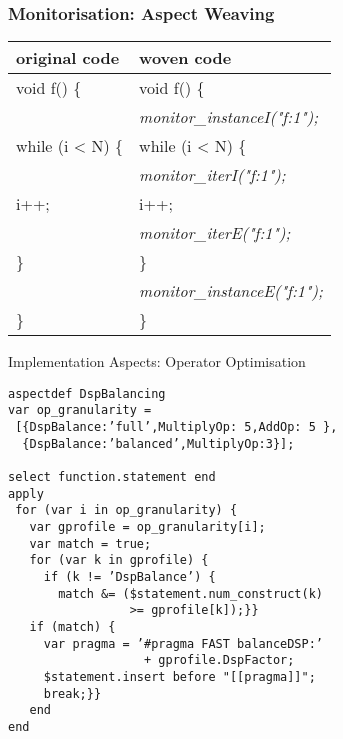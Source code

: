 \begin{frame}
  \frametitle{Monitorisation: Aspect Weaving}
\begin{center}
\begin{tabular}{p{5cm}|p{5cm}}
\hline
\bf{original code}           & \bf{woven code}                                   \\
\hline
\hline
void f() \{                  & void f() \{                                       \\
                             & \hspace{3ex}\emph{monitor\_instanceI("f:1");} \\
\hspace{3ex}while (i < N) \{ & \hspace{3ex}while (i < N) \{                      \\
                             & \hspace{6ex}\emph{monitor\_iterI("f:1");}     \\
\hspace{6ex}i++;             & \hspace{6ex}i++;                                  \\
                             & \hspace{6ex}\emph{monitor\_iterE("f:1");}     \\
\hspace{3ex}\}               & \hspace{3ex}\}                                    \\
                             & \hspace{3ex}\emph{monitor\_instanceE("f:1");} \\
\}                           & \}                                                \\
\hline
\end{tabular}
\end{center}
\end{frame}


\begin{frame}[fragile]{Implementation Aspects: Operator Optimisation}
\begin{lstlisting}[label=lst:label, style=lara]
aspectdef DspBalancing
var op_granularity =
 [{DspBalance:’full’,MultiplyOp: 5,AddOp: 5 },
  {DspBalance:’balanced’,MultiplyOp:3}];

select function.statement end
apply
 for (var i in op_granularity) {
   var gprofile = op_granularity[i];
   var match = true;
   for (var k in gprofile) {
     if (k != ’DspBalance’) {
       match &= ($statement.num_construct(k)
                 >= gprofile[k]);}}
   if (match) {
     var pragma = ’#pragma FAST balanceDSP:’
                   + gprofile.DspFactor;
     $statement.insert before "[[pragma]]";
     break;}}
   end
end
\end{lstlisting}
\end{frame}

